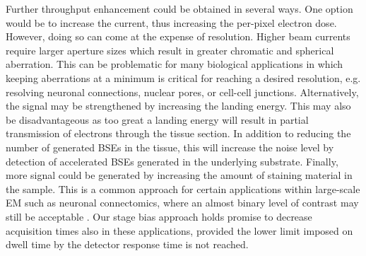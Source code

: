Further throughput enhancement could be obtained in several ways. One option would be to increase the current, thus increasing the per-pixel electron dose. However, doing so can come at the expense of resolution. Higher beam currents require larger aperture sizes which result in greater chromatic and spherical aberration. This can be problematic for many biological applications in which keeping aberrations at a minimum is critical for reaching a desired resolution, e.g. resolving neuronal connections, nuclear pores, or cell-cell junctions. Alternatively, the signal may be strengthened by increasing the landing energy. This may also be disadvantageous as too great a landing energy will result in partial transmission of electrons through the tissue section. In addition to reducing the number of generated BSEs in the tissue, this will increase the noise level by detection of accelerated BSEs generated in the underlying substrate. Finally, more signal could be generated by increasing the amount of staining material in the sample. This is a common approach for certain applications within large-scale EM such as neuronal connectomics, where an almost binary level of contrast may still be acceptable \cite{kuipers2015scanning}. Our stage bias approach holds promise to decrease acquisition times also in these applications, provided the lower limit imposed on dwell time by the detector response time is not reached.
